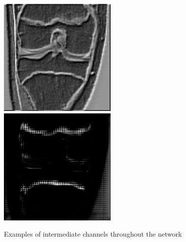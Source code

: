 \begin{figure}[H]
\endminipage\hfill
{}%
  \includegraphics[width=\linewidth]{imgs/channel2.png}
\endminipage\hfill
{}%
  \includegraphics[width=\linewidth]{imgs/channel4.png}
\endminipage
\caption{Examples of intermediate channels throughout the network}
\end{figure}

